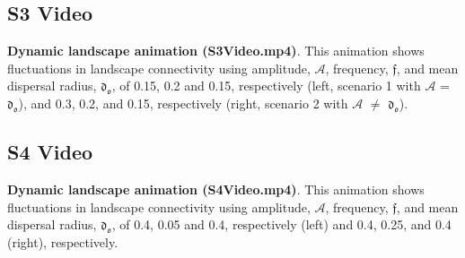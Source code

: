 \documentclass[a4paper,12pt]{article}
\begin{document}
\subsection*{S3 Video}
\label{S3_Video}
\textbf{Dynamic landscape animation (S3\underline{\hspace{.1in}}Video.mp4)}. This animation shows fluctuations in landscape connectivity using amplitude, $\mathcal{A}$, frequency, $\mathfrak{f}$, and mean dispersal radius, $\mathfrak{d_{o}}$, of 0.15, 0.2 and 0.15, respectively (left, scenario 1 with $\mathcal{A}$ = $\mathfrak{d_{o}}$), and 0.3, 0.2, and 0.15, respectively (right, scenario 2 with $\mathcal{A}$ $\neq$ $\mathfrak{d_{o}}$).\\

\subsection*{S4 Video}
\label{S4_Video}
\textbf{Dynamic landscape animation (S4\underline{\hspace{.1in}}Video.mp4)}. This animation shows fluctuations in landscape connectivity using amplitude, $\mathcal{A}$, frequency, $\mathfrak{f}$, and mean dispersal radius, $\mathfrak{d_{o}}$,  of 0.4, 0.05 and 0.4, respectively (left) and 0.4, 0.25, and 0.4 (right), respectively.\\

\end{document}

